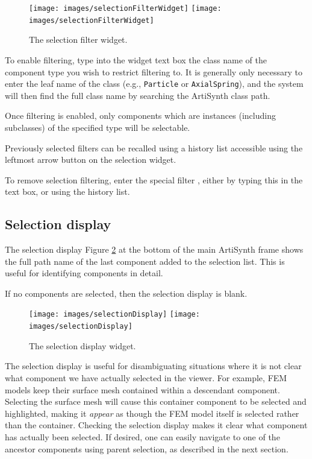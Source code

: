 \documentclass{article}
\begin{document}
\begin{figure}
\begin{center}
\iflatexml
\texttt{[image: images/selectionFilterWidget]}
\else
\texttt{[image: images/selectionFilterWidget]}
\fi
\end{center}
\caption{The selection filter widget.}%
\label{selectionFilterWidgetFig}
\end{figure}

To enable filtering, type into the widget text box the class name of
the component type you wish to restrict filtering to. It is generally
only necessary to enter the leaf name of the class (e.g., {\tt Particle}
or {\tt AxialSpring}), and the system will then find the full
class name by searching the ArtiSynth class path.

Once filtering is enabled, only components which are instances
(including subclasses) of the specified type will be selectable.

Previously selected filters can be recalled using a history
list accessible using the leftmost arrow button on the
selection widget.

To remove selection filtering, enter the special filter {\tt *}, either by
typing this in the text box, or using the history list.

\subsection{Selection display}
\label{selectionDisplaySec}

The selection display Figure \ref{selectionDisplayWidgetFig} at the bottom of the
main ArtiSynth frame shows the full path name of the last component
added to the selection list. This is useful for identifying components
in detail.

If no components are selected, then the selection display is blank.

\begin{figure}
\begin{center}
\iflatexml
\texttt{[image: images/selectionDisplay]}
\else
\texttt{[image: images/selectionDisplay]}
\fi
\end{center}
\caption{The selection display widget.}%
\label{selectionDisplayWidgetFig}
\end{figure}

The selection display is useful for disambiguating situations where it
is not clear what component we have actually selected in the viewer.
For example, FEM models keep their surface mesh contained within a
descendant component. Selecting the surface mesh will cause this
container component to be selected and highlighted, making it {\it
appear} as though the FEM model itself is selected rather than the
container. Checking the selection display makes it clear what
component has actually been selected. If desired, one can easily
navigate to one of the ancestor components using parent selection, as
described in the next section.
\end{document}
